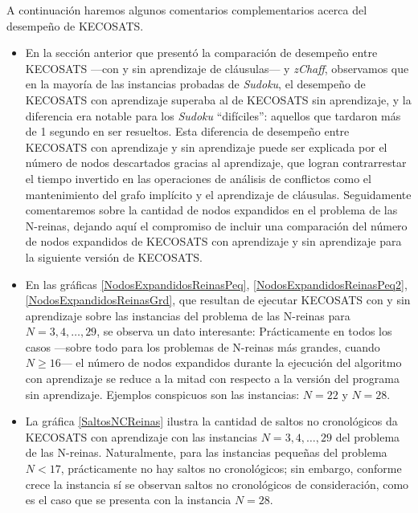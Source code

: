 \documentclass[12pt,lettersize,oneside]{article}
\begin{document}
A continuación haremos algunos comentarios complementarios acerca del desempeño
de KECOSATS.
\begin{itemize}
\item En la sección anterior que presentó la comparación de desempeño entre
  KECOSATS ---con y sin aprendizaje de cláusulas--- y \emph{zChaff}, observamos
  que en la mayoría de las instancias probadas de \emph{Sudoku}, el desempeño de
  KECOSATS con aprendizaje superaba al de KECOSATS sin aprendizaje, y la
  diferencia era notable para los \emph{Sudoku} ``difíciles'': aquellos que
  tardaron más de 1 segundo en ser resueltos. Esta diferencia de desempeño entre
  KECOSATS con aprendizaje y sin aprendizaje puede ser explicada por el número
  de nodos descartados gracias al aprendizaje, que logran contrarrestar el
  tiempo invertido en las operaciones de análisis de conflictos como el
  mantenimiento del grafo implícito y el aprendizaje de cláusulas. Seguidamente
  comentaremos sobre la cantidad de nodos expandidos en el problema de las
  N-reinas, dejando aquí el compromiso de incluir una comparación del número de
  nodos expandidos de KECOSATS con aprendizaje y sin aprendizaje para la
  siguiente versión de KECOSATS.

\item En las gráficas \ref{NodosExpandidosReinasPeq},
  \ref{NodosExpandidosReinasPeq2}, \ref{NodosExpandidosReinasGrd}, que resultan
  de ejecutar KECOSATS con y sin aprendizaje sobre las instancias del problema
  de las N-reinas para $N=3,4,\ldots,29$, se observa un dato interesante:
  Prácticamente en todos los casos ---sobre todo para los problemas de N-reinas
  más grandes, cuando $N\geq 16$--- el número de nodos expandidos durante la
  ejecución del algoritmo con aprendizaje se reduce a la mitad con respecto a la
  versión del programa sin aprendizaje. Ejemplos conspicuos son las instancias:
  $N=22$ y $N=28$.

\item La gráfica \ref{SaltosNCReinas} ilustra la cantidad de saltos no
  cronológicos da KECOSATS con aprendizaje con las instancias $N=3,4,\ldots,29$
  del problema de las N-reinas. Naturalmente, para las instancias pequeñas del
  problema $N<17$, prácticamente no hay saltos no cronológicos; sin embargo,
  conforme crece la instancia sí se observan saltos no cronológicos de
  consideración, como es el caso que se presenta con la instancia $N=28$. 
\end{itemize}
\end{document}
